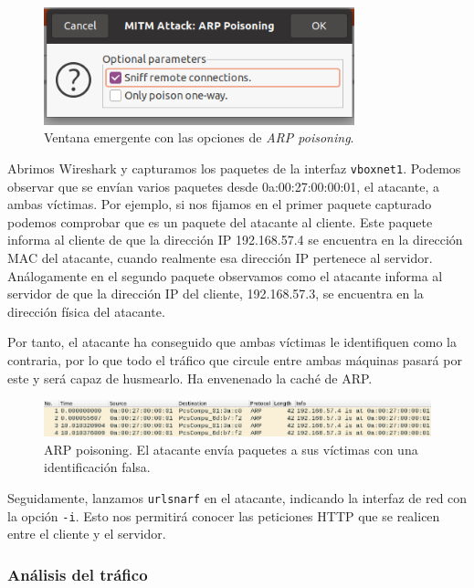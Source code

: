 \documentclass[11pt]{article}
\begin{document}
\begin{figure}[H]
	\centering
	\includegraphics[width=90mm]{images/ettercap-arp-poisoning}
	\caption{Ventana emergente con las opciones de \textit{ARP poisoning}.}
	\label{fig:host-list}
\end{figure}

Abrimos Wireshark y capturamos los paquetes de la interfaz \texttt{vboxnet1}. Podemos observar que se envían varios paquetes desde 0a:00:27:00:00:01, el atacante, a ambas víctimas. Por ejemplo, si nos fijamos en el primer paquete capturado podemos comprobar que es un paquete del atacante al cliente. Este paquete informa al cliente de que la dirección IP 192.168.57.4 se encuentra en la dirección MAC del atacante, cuando realmente esa dirección IP pertenece al servidor. Análogamente en el segundo paquete observamos como el atacante informa al servidor de que la dirección IP del cliente, 192.168.57.3, se encuentra en la dirección física del atacante.

Por tanto, el atacante ha conseguido que ambas víctimas le identifiquen como la contraria, por lo que todo el tráfico que circule entre ambas máquinas pasará por este y será capaz de husmearlo. Ha envenenado la caché de ARP.

\begin{figure}[H]
	\centering
	\includegraphics[width=140mm]{images/atack1/wireshark-arp}
	\caption{ARP poisoning. El atacante envía paquetes a sus víctimas con una identificación falsa.}
	\label{fig:wireshark-arp}
\end{figure}

Seguidamente, lanzamos \texttt{urlsnarf} en el atacante, indicando la interfaz de red con la opción \texttt{-i}. Esto nos permitirá
conocer las peticiones HTTP que se realicen entre el cliente y el servidor.

\subsubsection*{Análisis del tráfico}
\end{document}
